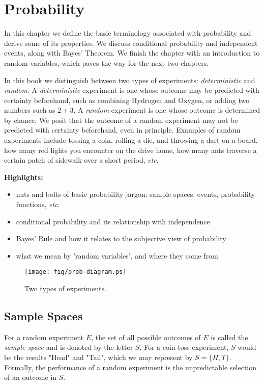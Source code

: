 \chapter{Probability}
\label{sec-4}

\noindent
In this chapter we define the basic terminology associated with
probability and derive some of its properties.
We discuss conditional probability and
independent events, along with Bayes' Theorem. We finish the chapter
with an introduction to random variables, which paves the way for the
next two chapters.

In this book we distinguish between two types of experiments:
\emph{deterministic} and \emph{random}. A \emph{deterministic} experiment is one
whose outcome may be predicted with certainty beforehand, such as
combining Hydrogen and Oxygen, or adding two numbers such as
\(2+3\). A \emph{random} experiment is one whose outcome is determined by
chance. We posit that the outcome of a random experiment may not be
predicted with certainty beforehand, even in principle. Examples of
random experiments include tossing a coin, rolling a die, and throwing
a dart on a board, how many red lights you encounter on the drive
home, how many ants traverse a certain patch of sidewalk over a short
period, \emph{etc}.

\textbf{Highlights:}
\begin{itemize}
\item nuts and bolts of basic probability jargon: sample spaces, events,
probability functions, \emph{etc}.
\item conditional probability and its relationship with independence
\item Bayes' Rule and how it relates to the subjective view of probability
\item what we mean by 'random variables', and where they come from
\end{itemize}

\begin{figure}[ht!]
\centering
\texttt{[image: fig/prob-diagram.ps]}
\caption[Two types of experiments]{\label{fig-diagram}\small Two types of experiments.}
\end{figure}

\section{Sample Spaces}
\label{sec-4-1}

For a random experiment \(E\), the set of all possible outcomes of
\(E\) is called the \emph{sample space}  and is denoted
by the letter \(S\). For a coin-toss experiment, \(S\) would be the
results "Head" and "Tail", which we may represent by \( S = \{H,T
\} \). Formally, the performance of a random experiment is the
unpredictable selection of an outcome in \(S\).


